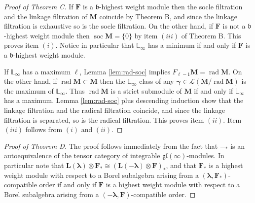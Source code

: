 \documentclass[11pt,fleqn]{amsart}
\newcommand\LL{\mathbb L}
\renewcommand\ll{{\boldsymbol \ell}}
\theoremstyle{definition}
\theoremstyle{remark}
\theoremstyle{remark}
\newcommand\gl{\mathfrak{gl}}
\newcommand\lie[1]{\mathfrak{#1}}
\newcommand\wt[1]{\boldsymbol{#1}}
\DeclareMathOperator\soc{soc}
\DeclareMathOperator\rad{rad}
\begin{document}
\begin{proof}[Proof of Theorem C]
If $\mathbf F$ is a $\lie b$-highest weight module then the socle filtration 
and the linkage filtration of $\mathbf M$ coincide by Theorem B, and since the 
linkage filtration is exhaustive so is the socle filtration. On the other hand, 
if $\mathbf F$ is not a $\lie b$-highest weight module then $\soc \mathbf M = 
\{0\}$ by item $(iii)$ of Theorem B. This proves item $(i)$. Notice in 
particular that $\LL_\infty$ has a minimum if and only if $\mathbf F$ is a 
$\lie b$-highest weight module.

If $\LL_\infty$ has a maximum $\ll$, Lemma \ref{lem:rad-soc} implies $F_{\ll-1} 
\mathbf M = \rad \mathbf M$. On the other hand, if $\rad \mathbf M \subset 
\mathbf M$ then the $\LL_\infty$ class of any $\wt\gamma \in \mathcal L(\mathbf 
M/\rad \mathbf M)$ is the maximum of $\LL_\infty$. Thus $\rad \mathbf M$ is a 
strict submodule of $\mathbf M$ if and only if $\LL_\infty$ has a maximum. 
Lemma \ref{lem:rad-soc} plus descending induction show that the linkage 
filtration and the radical filtration coincide, and since the linkage 
filtration is separated, so is the radical filtration. This proves item $(ii)$.
Item $(iii)$ follows from $(i)$ and $(ii)$. 
\end{proof}

\begin{proof}[Proof of Theorem D]
The proof follows immediately from the fact that $-_*$ is an autoequivalence
of the tensor category of integrable $\gl(\infty)$-modules. In particular note 
that $\mathbf L(\wt\lambda) \otimes \mathbf F_* \cong (\mathbf L(-\wt\lambda) 
\otimes \mathbf F)_*$, and that $\mathbf F_*$ is a highest weight module with 
respect to a Borel subalgebra arising from a $(\wt\lambda,\mathbf 
F_*)$-compatible order if and only if $\mathbf F$ is a highest weight module 
with respect to a Borel subalgebra arising from a $(-\wt\lambda,\mathbf 
F)$-compatible order.
\end{proof}
\end{document}
